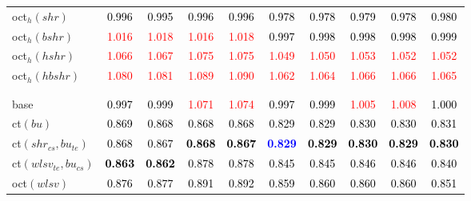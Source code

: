 \begin{tabular}[t]{l|ccccccccc}
oct$_h(shr)$ & \textcolor{black}{0.996} & \textcolor{black}{0.995} & \textcolor{black}{0.996} & \textcolor{black}{0.996} & \textcolor{black}{0.978} & \textcolor{black}{0.978} & \textcolor{black}{0.979} & \textcolor{black}{0.978} & \textcolor{black}{0.980}\\
oct$_h(bshr)$ & \textcolor{red}{1.016} & \textcolor{red}{1.018} & \textcolor{red}{1.016} & \textcolor{red}{1.018} & \textcolor{black}{0.997} & \textcolor{black}{0.998} & \textcolor{black}{0.998} & \textcolor{black}{0.998} & \textcolor{black}{0.999}\\
oct$_h(hshr)$ & \textcolor{red}{1.066} & \textcolor{red}{1.067} & \textcolor{red}{1.075} & \textcolor{red}{1.075} & \textcolor{red}{1.049} & \textcolor{red}{1.050} & \textcolor{red}{1.053} & \textcolor{red}{1.052} & \textcolor{red}{1.052}\\
oct$_h(hbshr)$ & \textcolor{red}{1.080} & \textcolor{red}{1.081} & \textcolor{red}{1.089} & \textcolor{red}{1.090} & \textcolor{red}{1.062} & \textcolor{red}{1.064} & \textcolor{red}{1.066} & \textcolor{red}{1.066} & \textcolor{red}{1.065}\\[-1.5ex]
\hline\\[-1.5ex]
\addlinespace[0.3em]
\multicolumn{10}{c}{\textbf{$k = 2$}}\\
base & \textcolor{black}{0.997} & \textcolor{black}{0.999} & \textcolor{red}{1.071} & \textcolor{red}{1.074} & \textcolor{black}{0.997} & \textcolor{black}{0.999} & \textcolor{red}{1.005} & \textcolor{red}{1.008} & \textcolor{black}{1.000}\\
ct$(bu)$ & \textcolor{black}{0.869} & \textcolor{black}{0.868} & \textcolor{black}{0.868} & \textcolor{black}{0.868} & \textcolor{black}{0.829} & \textcolor{black}{0.829} & \textcolor{black}{0.830} & \textcolor{black}{0.830} & \textcolor{black}{0.831}\\
ct$(shr_{cs}, bu_{te})$ & \textcolor{black}{0.868} & \textcolor{black}{0.867} & \textcolor{black}{\textbf{0.868}} & \textcolor{black}{\textbf{0.867}} & \textcolor{blue}{\textbf{0.829}} & \textcolor{black}{\textbf{0.829}} & \textcolor{black}{\textbf{0.830}} & \textcolor{black}{\textbf{0.829}} & \textcolor{black}{\textbf{0.830}}\\
ct$(wlsv_{te}, bu_{cs})$ & \textcolor{black}{\textbf{0.863}} & \textcolor{black}{\textbf{0.862}} & \textcolor{black}{0.878} & \textcolor{black}{0.878} & \textcolor{black}{0.845} & \textcolor{black}{0.845} & \textcolor{black}{0.846} & \textcolor{black}{0.846} & \textcolor{black}{0.840}\\
oct$(wlsv)$ & \textcolor{black}{0.876} & \textcolor{black}{0.877} & \textcolor{black}{0.891} & \textcolor{black}{0.892} & \textcolor{black}{0.859} & \textcolor{black}{0.860} & \textcolor{black}{0.860} & \textcolor{black}{0.860} & \textcolor{black}{0.851}\\

\end{tabular}
